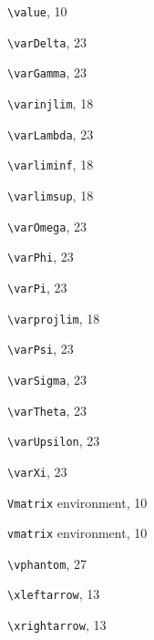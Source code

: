 \documentclass[leqno,titlepage,openany]{amsldoc}[1999/12/13]
\begin{document}
\begin{theindex}
  \item \verb*+\value+, 10
  \item \verb*+\varDelta+, 23
  \item \verb*+\varGamma+, 23
  \item \verb*+\varinjlim+, 18
  \item \verb*+\varLambda+, 23
  \item \verb*+\varliminf+, 18
  \item \verb*+\varlimsup+, 18
  \item \verb*+\varOmega+, 23
  \item \verb*+\varPhi+, 23
  \item \verb*+\varPi+, 23
  \item \verb*+\varprojlim+, 18
  \item \verb*+\varPsi+, 23
  \item \verb*+\varSigma+, 23
  \item \verb*+\varTheta+, 23
  \item \verb*+\varUpsilon+, 23
  \item \verb*+\varXi+, 23
  \item \texttt{Vmatrix} environment, 10
  \item \texttt{vmatrix} environment, 10
  \item \verb*+\vphantom+, 27

  \indexspace

  \item \verb*+\xleftarrow+, 13
  \item \verb*+\xrightarrow+, 13

\end{theindex}
\end{document}

